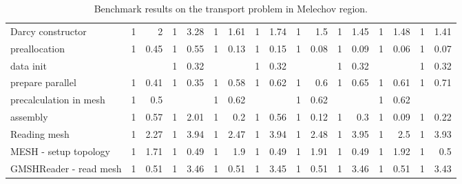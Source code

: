 \begin{sidewaystable}[!htbp]
\begin{tabular}{|l|r|r|r|r|r|r|r|r|r|r|r|r|r|r|r|r|}
  Darcy constructor                   &   1   &   2   &   1   &   3.28    &   1   &   1.61    &   1   &   1.74    &   1   &   1.5 &   1   &   1.45    &   1   &   1.48    &   1   &   1.41    \\
   preallocation                     &   1   &   0.45    &   1   &   0.55    &   1   &   0.13    &   1   &   0.15    &   1   &   0.08    &   1   &   0.09    &   1   &   0.06    &   1   &   0.07    \\
   data init                         &       &           &   1   &   0.32    &       &           &   1   &   0.32    &       &           &   1   &   0.32    &       &           &   1   &   0.32    \\
   prepare parallel                  &   1   &   0.41    &   1   &   0.35    &   1   &   0.58    &   1   &   0.62    &   1   &   0.6 &   1   &   0.65    &   1   &   0.61    &   1   &   0.71    \\
   precalculation in mesh            &   1   &   0.5     &       &           &   1   &   0.62    &       &           &   1   &   0.62    &   &           &   1   &   0.62    &       &      \\
\rowcolor{GreenYellow}   
   assembly                          &   1   &   0.57    &   1   &   2.01    &   1   &   0.2 &   1   &   0.56    &   1   &   0.12    &   1   &   0.3 &   1   &   0.09    &   1   &   0.22    \\
\rowcolor{GreenYellow}  
  Reading mesh                        &   1   &   2.27    &   1   &   3.94    &   1   &   2.47    &   1   &   3.94    &   1   &   2.48    &   1   &   3.95    &   1   &   2.5 &   1   &   3.93    \\
   MESH - setup topology             &   1   &   1.71    &   1   &   0.49    &   1   &   1.9 &   1   &   0.49    &   1   &   1.91    &   1   &   0.49    &   1   &   1.92    &   1   &   0.5 \\
  GMSHReader - read mesh            &   1   &   0.51    &   1   &   3.46    &   1   &   0.51    &   1   &   3.45    &   1   &   0.51    &   1   &   3.46    &   1   &   0.51    &   1   &   3.43    \\
\hline
\end{tabular}
\caption{Benchmark results on the transport problem in Melechov region.}
\label{tab:profiler_Mel1}
\end{sidewaystable}